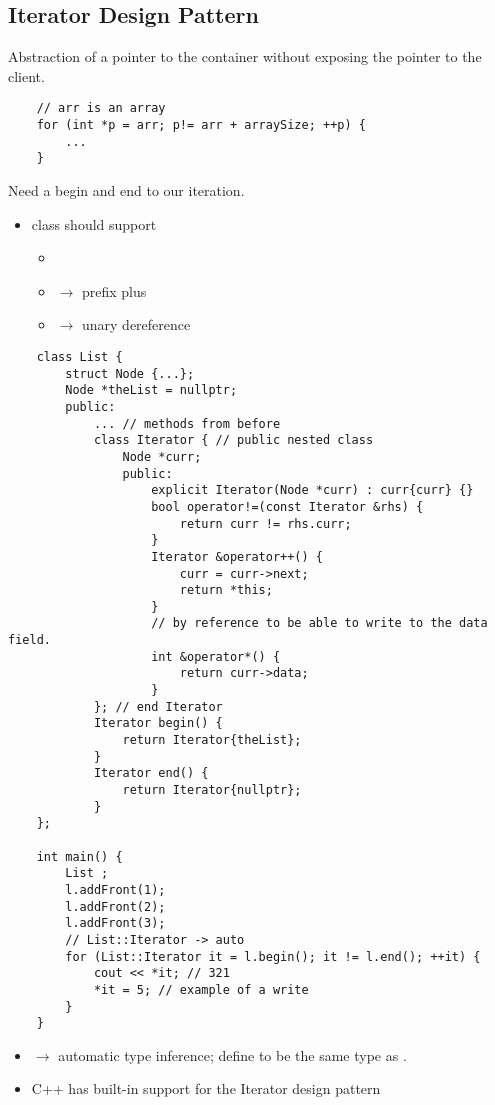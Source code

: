 \subsection{Iterator Design Pattern}
Abstraction of a pointer to the container without exposing the pointer to the client.
\begin{lstlisting}
    // arr is an array
    for (int *p = arr; p!= arr + arraySize; ++p) {
        ...
    }
\end{lstlisting}
Need a begin and end to our iteration.
\begin{itemize}
    \item class should support
          \begin{itemize}
              \item \code{!=}
              \item \code{++} $ \rightarrow $ prefix plus
              \item \code{*} $ \rightarrow $ unary dereference
          \end{itemize}
\end{itemize}

\begin{lstlisting}
    class List {
        struct Node {...};
        Node *theList = nullptr;
        public:
            ... // methods from before
            class Iterator { // public nested class
                Node *curr;
                public:
                    explicit Iterator(Node *curr) : curr{curr} {}
                    bool operator!=(const Iterator &rhs) {
                        return curr != rhs.curr;
                    }
                    Iterator &operator++() {
                        curr = curr->next;
                        return *this;
                    }
                    // by reference to be able to write to the data field.
                    int &operator*() {
                        return curr->data;
                    }
            }; // end Iterator
            Iterator begin() {
                return Iterator{theList};
            }
            Iterator end() {
                return Iterator{nullptr};
            }
    };

    int main() {
        List ;
        l.addFront(1);
        l.addFront(2);
        l.addFront(3);
        // List::Iterator -> auto
        for (List::Iterator it = l.begin(); it != l.end(); ++it) {
            cout << *it; // 321
            *it = 5; // example of a write
        }
    }

\end{lstlisting}
\begin{itemize}
    \item {} $ \rightarrow $ automatic type inference; define 
          to be the same type as .
    \item C++ has built-in support for the Iterator design pattern
\end{itemize}
